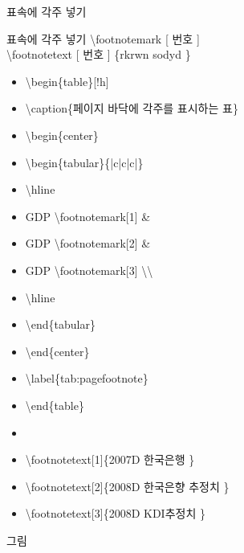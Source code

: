 \documentclass[10pt,xcolor=pdftex,dvipsnames,table,handout]{beamer}
\begin{document}
		\begin{frame}[t,shrink=40]{표속에 각주 넣기}

			\begin{block} {표속에 각주 넣기}
			\textbackslash footnotemark [ 번호 ] \\
			\textbackslash footnotetext [ 번호 ] \{rkrwn sodyd \}
			\end{block}

			\begin{example}
			\begin{itemize}
				\item[]	\textbackslash begin\{table\}[!h]
				\item[]	\textbackslash caption\{페이지 바닥에 각주를 표시하는 표\}
				\item[]	\textbackslash begin\{center\}
				\item[]	\textbackslash begin\{tabular\}\{|c|c|c|\}
				\item[]	\textbackslash hline
				\item[]	GDP \textbackslash footnotemark[1] \&
				\item[]	GDP \textbackslash footnotemark[2] \&
				\item[]	GDP \textbackslash footnotemark[3] \textbackslash \textbackslash
				\item[]	\textbackslash hline
				\item[]	\textbackslash end\{tabular\}
				\item[]	\textbackslash end\{center\}
				\item[]	\textbackslash label\{tab:pagefootnote\}
				\item[]	\textbackslash end\{table\}
				\item[]	
				\item[]	\textbackslash footnotetext[1]\{2007D 한국은행 \}
				\item[]	\textbackslash footnotetext[2]\{2008D 한국은향 추정치 \}
				\item[]	\textbackslash footnotetext[3]\{2008D KDI추정치 \}
			\end{itemize}
			\end{example}
		\end{frame}




		\begin{frame}[plain]
		\end{frame}
		\begin{frame}[plain]
		\Huge{그림}
		\end{frame}
\end{document}
